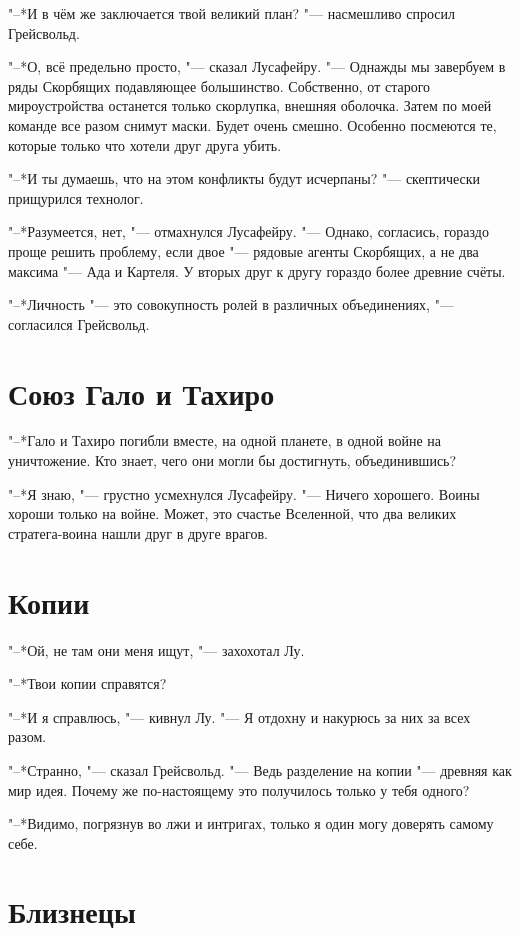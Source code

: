 \documentclass[a4paper,10pt]{book}
\begin{document}
"--*И в чём же заключается твой великий план? "--- насмешливо спросил 
Грейсвольд.

"--*О, всё предельно просто, "--- сказал Лусафейру. "--- Однажды мы завербуем в 
ряды Скорбящих подавляющее большинство. Собственно, от старого мироустройства 
останется только скорлупка, внешняя оболочка. Затем по моей команде все разом 
снимут маски. Будет очень смешно. Особенно посмеются те, которые только что 
хотели друг друга убить.

"--*И ты думаешь, что на этом конфликты будут исчерпаны? "--- скептически 
прищурился технолог.

"--*Разумеется, нет, "--- отмахнулся Лусафейру. "--- Однако, согласись, гораздо 
проще решить проблему, если двое "--- рядовые агенты Скорбящих, а не два 
максима "--- Ада и Картеля. У вторых друг к другу гораздо более древние счёты.

"--*Личность "--- это совокупность ролей в различных объединениях, "--- 
согласился Грейсвольд.

\section{Союз Гало и Тахиро}

"--*Гало и Тахиро погибли вместе, на одной планете, в одной войне на 
уничтожение. Кто знает, чего они могли бы достигнуть, объединившись?

"--*Я знаю, "--- грустно усмехнулся Лусафейру. "--- Ничего хорошего. Воины 
хороши только на войне. Может, это счастье Вселенной, что два великих 
стратега-воина нашли друг в друге врагов.

\section{Копии}

"--*Ой, не там они меня ищут, "--- захохотал Лу.

"--*Твои копии справятся?

"--*И я справлюсь, "--- кивнул Лу. "--- Я отдохну и накурюсь за них за всех разом.

"--*Странно, "--- сказал Грейсвольд. "--- Ведь разделение на копии "--- древняя как мир идея. Почему же по-настоящему это получилось только у тебя одного?

"--*Видимо, погрязнув во лжи и интригах, только я один могу доверять самому себе.

\section{Близнецы}
\end{document}
